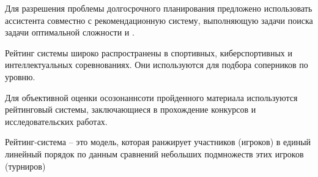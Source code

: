 Для разрешения проблемы долгосрочного планирования предложено 
использовать ассистента совместно с рекомендационную систему,
выполняющую задачи поиска задачи оптимальной сложности и .

Рейтинг системы широко распространены в спортивных, киберспортивных и интеллектуальных соревнованиях.
Они используются для подбора соперников по уровню.

Для объективной оценки осозонаннсоти пройденного материала используются рейтинговый системы, заключающиеся в прохождение конкурсов и исследовательских работах.

Рейтинг-система – это модель, которая ранжирует
участников (игроков) в единый линейный порядок по
данным сравнений небольших подмножеств этих игроков
(турниров)


